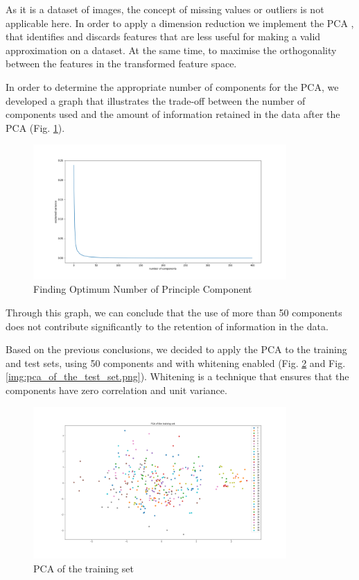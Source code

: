 \documentclass[conference]{IEEEtran}
\begin{document}
As it is a dataset of images, the concept of missing values or outliers is not applicable here. In order to apply a dimension reduction we implement the PCA \cite{pca}, that identifies and discards features that are less useful for making a valid approximation on a dataset. At the same time, to maximise the orthogonality between the features in the transformed feature space.

In order to determine the appropriate number of components for the PCA, we developed a graph that illustrates the trade-off between the number of components used and the amount of information retained in the data after the PCA (Fig. \ref{img:number_of_components_vs_explained_variance.png}).

\begin{figure}[H]
    \centering
    \includegraphics[width=3.8in]{number_of_components_vs_explained_variance.png}
    \caption{Finding Optimum Number of Principle Component}
    \label{img:number_of_components_vs_explained_variance.png}
\end{figure}

Through this graph, we can conclude that the use of more than 50 components does not contribute significantly to the retention of information in the data.

Based on the previous conclusions, we decided to apply the PCA to the training and test sets, using 50 components and with whitening enabled (Fig. \ref{img:pca_of_the_training_set.png} and Fig. \ref{img:pca_of_the_test_set.png}). Whitening is a technique that ensures that the components have zero correlation and unit variance.

\begin{figure}[H]
    \centering
    \includegraphics[width=3.8in]{pca_of_the_training_set.png}
    \caption{PCA of the training set}
    \label{img:pca_of_the_training_set.png}
\end{figure}
\end{document}
